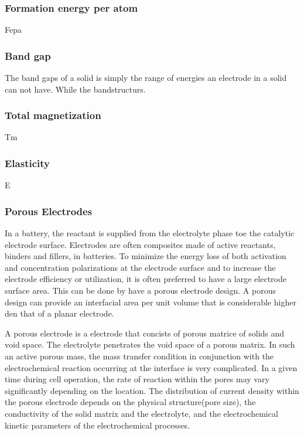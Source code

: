 	\subsubsection*{Formation energy per atom}
	Fepa
	\subsubsection*{Band gap}
	The band gaps of a solid is simply the range of energies an electrode in a solid can not have. While the bandstructurs.
	
	\subsubsection*{Total magnetization}
	Tm
	\subsubsection*{Elasticity}
	E
	\subsubsection*{Porous Electrodes}
	In a battery, the reactant is supplied from the electrolyte phase toe the catalytic electrode surface. Electrodes are often composites made of active reactants, binders and fillers, in batteries. To minimize the energy loss of both activation and concentration polarizations at the electrode surface and to increase the electrode efficiency or utilization, it is often preferred to have a large electrode surface area. This can be done by have a porous electrode design. A porous design can provide an interfacial area per unit volume that is considerable higher den that of a planar electrode. 
	
	A porous electrode is a electrode that concists of porous matrice of solids and void space. The electrolyte penetrates the void space of a porous matrix. In such an active porous mass, the mass transfer condition in conjunction with the electrochemical reaction occurring at the interface is very complicated. In a given time during cell operation, the rate of reaction within the pores may vary significantly depending on the location. The distribution of current density within the porous electrode depends on the physical structure(pore size), the conductivity of the solid matrix and the electrolyte, and the electrochemical kinetic parameters of the electrochemical processes.  
	

